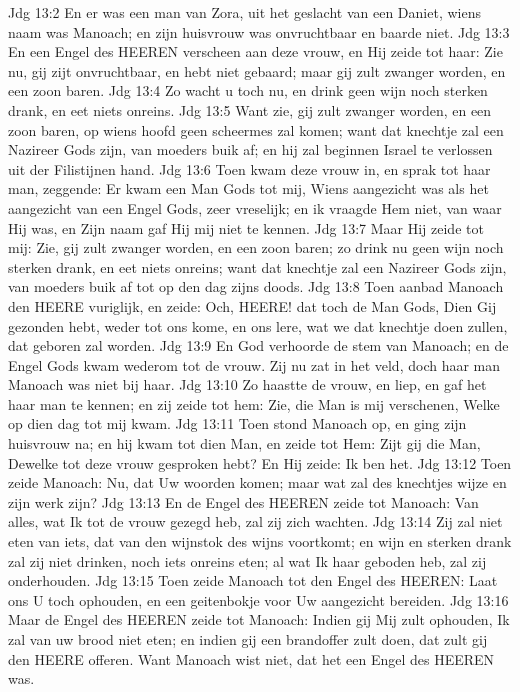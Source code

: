 Jdg 13:2  En er was een man van Zora, uit het geslacht van een Daniet, wiens naam was Manoach; en zijn huisvrouw was onvruchtbaar en baarde niet.
Jdg 13:3  En een Engel des HEEREN verscheen aan deze vrouw, en Hij zeide tot haar: Zie nu, gij zijt onvruchtbaar, en hebt niet gebaard; maar gij zult zwanger worden, en een zoon baren.
Jdg 13:4  Zo wacht u toch nu, en drink geen wijn noch sterken drank, en eet niets onreins.
Jdg 13:5  Want zie, gij zult zwanger worden, en een zoon baren, op wiens hoofd geen scheermes zal komen; want dat knechtje zal een Nazireer Gods zijn, van moeders buik af; en hij zal beginnen Israel te verlossen uit der Filistijnen hand.
Jdg 13:6  Toen kwam deze vrouw in, en sprak tot haar man, zeggende: Er kwam een Man Gods tot mij, Wiens aangezicht was als het aangezicht van een Engel Gods, zeer vreselijk; en ik vraagde Hem niet, van waar Hij was, en Zijn naam gaf Hij mij niet te kennen.
Jdg 13:7  Maar Hij zeide tot mij: Zie, gij zult zwanger worden, en een zoon baren; zo drink nu geen wijn noch sterken drank, en eet niets onreins; want dat knechtje zal een Nazireer Gods zijn, van moeders buik af tot op den dag zijns doods.
Jdg 13:8  Toen aanbad Manoach den HEERE vuriglijk, en zeide: Och, HEERE! dat toch de Man Gods, Dien Gij gezonden hebt, weder tot ons kome, en ons lere, wat we dat knechtje doen zullen, dat geboren zal worden.
Jdg 13:9  En God verhoorde de stem van Manoach; en de Engel Gods kwam wederom tot de vrouw. Zij nu zat in het veld, doch haar man Manoach was niet bij haar.
Jdg 13:10  Zo haastte de vrouw, en liep, en gaf het haar man te kennen; en zij zeide tot hem: Zie, die Man is mij verschenen, Welke op dien dag tot mij kwam.
Jdg 13:11  Toen stond Manoach op, en ging zijn huisvrouw na; en hij kwam tot dien Man, en zeide tot Hem: Zijt gij die Man, Dewelke tot deze vrouw gesproken hebt? En Hij zeide: Ik ben het.
Jdg 13:12  Toen zeide Manoach: Nu, dat Uw woorden komen; maar wat zal des knechtjes wijze en zijn werk zijn?
Jdg 13:13  En de Engel des HEEREN zeide tot Manoach: Van alles, wat Ik tot de vrouw gezegd heb, zal zij zich wachten.
Jdg 13:14  Zij zal niet eten van iets, dat van den wijnstok des wijns voortkomt; en wijn en sterken drank zal zij niet drinken, noch iets onreins eten; al wat Ik haar geboden heb, zal zij onderhouden.
Jdg 13:15  Toen zeide Manoach tot den Engel des HEEREN: Laat ons U toch ophouden, en een geitenbokje voor Uw aangezicht bereiden.
Jdg 13:16  Maar de Engel des HEEREN zeide tot Manoach: Indien gij Mij zult ophouden, Ik zal van uw brood niet eten; en indien gij een brandoffer zult doen, dat zult gij den HEERE offeren. Want Manoach wist niet, dat het een Engel des HEEREN was.
